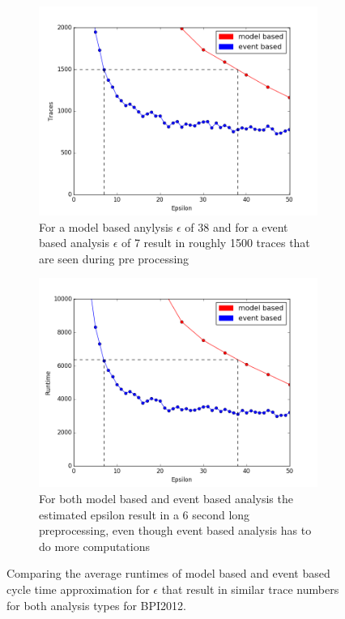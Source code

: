 \documentclass[
	a4paper,
	pagesize,
	pdftex,
	12pt,
	twoside, %
	BCOR=5mm, %
	ngerman,
	fleqn,
	final,
	]{scrartcl}
\begin{document}
\begin{figure}[h]
	\begin{subfigure}[t]{.5\textwidth}
	  \centering
	  \includegraphics[width=.8\linewidth]{data/lax_vs_strict_traces_epsilon_zoomed.png}
	  \caption{For a model based anylysis $\epsilon$ of 38 and for a event based analysis $\epsilon$ of 7 result in roughly 1500 traces that are seen during pre processing}
	  \label{fig:sametraces12}
	\end{subfigure}%
	\begin{subfigure}[t]{.5\textwidth}
	  \centering
	  \includegraphics[width=.8\linewidth]{data/kax_vs_strict_runtime_zoomed.png}
	  \caption{For both model based and event based analysis the estimated epsilon result in a 6 second long preprocessing, even though event based analysis has to do more computations}
	  \label{fig:sametime}
	\end{subfigure}
	\caption{Comparing the average runtimes of model based and event based cycle time approximation for $\epsilon$ that result in similar trace numbers for both analysis types for BPI2012.}
	\label{fig:sametimetraces12}
\end{figure}
\end{document}
